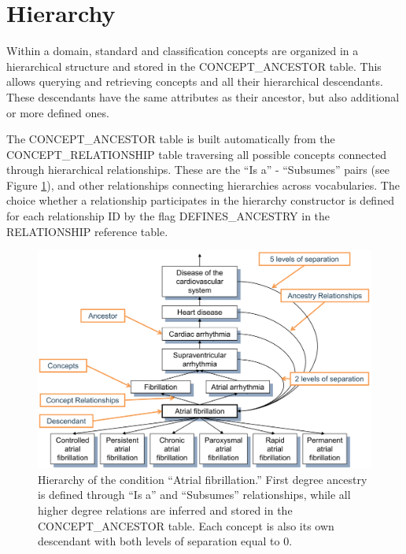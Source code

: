 \documentclass[11pt]{book}
\theoremstyle{definition}
\theoremstyle{definition}
\theoremstyle{definition}
\theoremstyle{remark}
\begin{document}
\section{Hierarchy}\label{conceptAncestor}

Within a domain, standard and classification concepts are organized in a
hierarchical structure and stored in the CONCEPT\_ANCESTOR table. This
allows querying and retrieving concepts and all their hierarchical
descendants. These descendants have the same attributes as their
ancestor, but also additional or more defined ones.

The CONCEPT\_ANCESTOR table is built automatically from the
CONCEPT\_RELATIONSHIP table traversing all possible concepts connected
through hierarchical relationships. These are the ``Is a'' -
``Subsumes'' pairs (see Figure \ref{fig:conceptAncestor}), and other
relationships connecting hierarchies across vocabularies. The choice
whether a relationship participates in the hierarchy constructor is
defined for each relationship ID by the flag DEFINES\_ANCESTRY in the
RELATIONSHIP reference table.







\begin{figure}

{\centering \includegraphics[width=1\linewidth]{images/StandardizedVocabularies/conceptAncestor} 

}

\caption{Hierarchy of the condition ``Atrial fibrillation.'' First
degree ancestry is defined through ``Is a'' and ``Subsumes''
relationships, while all higher degree relations are inferred and stored
in the CONCEPT\_ANCESTOR table. Each concept is also its own descendant
with both levels of separation equal to 0. }\label{fig:conceptAncestor}
\end{figure}
\end{document}
